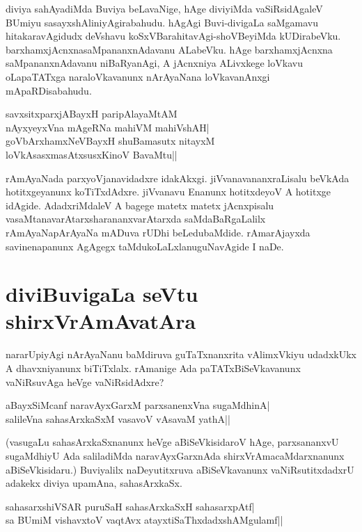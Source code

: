 diviya sahAyadiMda Buviya beLavaNige, hAge diviyiMda vaSiRsidAgaleV BUmiyu sasayxshAliniyAgirabahudu. hAgAgi Buvi-divigaLa saMgamavu hitakaravAgidudx deVshavu koSxVBarahitavAgi-shoVBeyiMda kUDirabeVku. barxhamxjAcnxnasaMpananxnAdavanu ALabeVku. hAge barxhamxjAcnxna saMpananxnAdavanu niBaRyanAgi, A jAcnxniya ALivxkege loVkavu oLapaTATxga naraloVkavanunx nArAyaNana loVkavanAnxgi mApaRDisabahudu. 

\begin{shloka} 
savxsitxparxjABayxH paripAlayaMtAM\label{149b}\\ 
nAyxyeyxVna mAgeRNa mahiVM mahiVshAH|\\ 
goVbArxhamxNeVBayxH shuBamasutx nitayxM\\ 
loVkAsasxmasAtxsusxKinoV BavaMtu||
\end{shloka} 

rAmAyaNada parxyoVjanavidadxre idakAkxgi. jiVvanavananxraLisalu beVkAda hotitxgeyanunx koTiTxdAdxre. jiVvanavu Enanunx hotitxdeyoV A hotitxge idAgide. AdadxriMdaleV A bagege matetx matetx jAcnxpisalu vasaMtanavarAtarxsharananxvarAtarxda saMdaBaRgaLalilx rAmAyaNapArAyaNa mADuva rUDhi beLedubaMdide. rAmarAjayxda savinenapanunx AgAgegx taMdukoLaLxlanuguNavAgide I naDe. 

\section*{diviBuvigaLa seVtu shirxVrAmAvatAra}

nararUpiyAgi nArAyaNanu baMdiruva guTaTxnanxrita vAlimxVkiyu udadxkUkx A dhavxniyanunx biTiTxlalx. rAmanige Ada paTATxBiSeVkavanunx vaNiRsuvAga heVge vaNiRsidAdxre? 

\begin{shloka} 
aBayxSiMcanf naravAyxGarxM parxsanenxVna sugaMdhinA|\label{150}\\
salileVna sahasArxkaSxM vasavoV vAsavaM yathA||
\end{shloka} 

(vasugaLu sahasArxkaSxnanunx heVge aBiSeVkisidaroV hAge, parxsananxvU sugaMdhiyU Ada saliladiMda naravAyxGarxnAda shirxVrAmacaMdarxnanunx aBiSeVkisidaru.) Buviyalilx naDeyutitxruva aBiSeVkavanunx vaNiRsutitxdadxrU adakekx diviya upamAna, sahasArxkaSx. 

\begin{shloka} 
sahasarxshiVSAR puruSaH sahasArxkaSxH sahasarxpAtf|\label{150c}\\ 
sa BUmiM vishavxtoV vaqtAvx atayxtiSaThxdadxshAMgulamf||
\end{shloka} 

